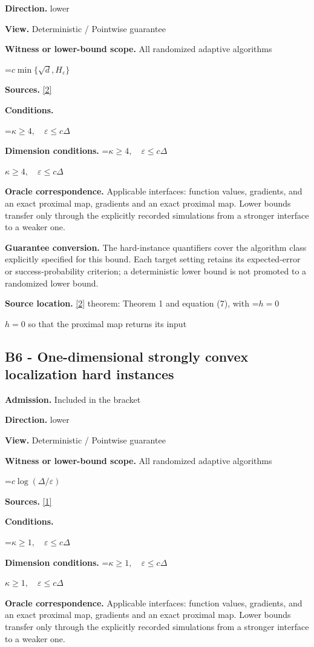 \documentclass[10pt,a4paper]{article}
\newcommand{\AtlasMath}[1]{\par\begingroup\centering\setbox0=\hbox{$\displaystyle #1$}\ifdim\wd0>1.4\linewidth\typeout{ATLAS WIDE FORMULA: \the\wd0}\fi\ifdim\wd0>\linewidth\resizebox{\linewidth}{!}{\box0}\else\box0\fi\par\endgroup}
\newcommand{\AtlasInlineMath}[1]{\begingroup\setbox0=\hbox{$#1$}\ifdim\wd0>.4\linewidth\endgroup\AtlasMath{#1}\else\endgroup$#1$\fi}
\begin{document}
\textbf{Direction.} lower

\textbf{View.} Deterministic / Pointwise guarantee

\textbf{Witness or lower-bound scope.} All randomized adaptive algorithms

\AtlasMath{c\min\{\sqrt d,H_\varepsilon\}}
\textbf{Sources.} \href{https://arxiv.org/pdf/2609.10874}{[2]}

\textbf{Conditions.} 
\AtlasMath{\kappa\ge4,\quad\varepsilon\le c\Delta}


\textbf{Dimension conditions.} \AtlasInlineMath{\kappa\ge4,\quad\varepsilon\le c\Delta}

\textbf{Oracle correspondence.} Applicable interfaces: function values, gradients, and an exact proximal map, gradients and an exact proximal map. Lower bounds transfer only through the explicitly recorded simulations from a stronger interface to a weaker one.

\textbf{Guarantee conversion.} The hard-instance quantifiers cover the algorithm class explicitly specified for this bound. Each target setting retains its expected-error or success-probability criterion; a deterministic lower bound is not promoted to a randomized lower bound.

\textbf{Source location.} \href{https://arxiv.org/pdf/2609.10874}{[2]} theorem: Theorem 1 and equation (7), with \AtlasInlineMath{h=0} so that the proximal map returns its input

\subsection{B6 - One-dimensional strongly convex localization hard instances}
\textbf{Admission.} Included in the bracket

\textbf{Direction.} lower

\textbf{View.} Deterministic / Pointwise guarantee

\textbf{Witness or lower-bound scope.} All randomized adaptive algorithms

\AtlasMath{c\log(\Delta/\varepsilon)}
\textbf{Sources.} \href{https://www.tau.ac.il/~becka/FISTA.pdf}{[1]}

\textbf{Conditions.} 
\AtlasMath{\kappa\ge1,\quad\varepsilon\le c\Delta}


\textbf{Dimension conditions.} \AtlasInlineMath{\kappa\ge1,\quad\varepsilon\le c\Delta}

\textbf{Oracle correspondence.} Applicable interfaces: function values, gradients, and an exact proximal map, gradients and an exact proximal map. Lower bounds transfer only through the explicitly recorded simulations from a stronger interface to a weaker one.
\end{document}
